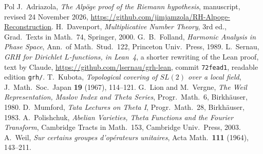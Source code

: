 \documentclass[reqno]{amsart}
\theoremstyle{definition}
\theoremstyle{plain}
\begin{document}
\begin{thebibliography}{Pol}
 J.~Adriazola, \emph{The Alp\"oge proof of the Riemann hypothesis}, manuscript, revised 24 November 2026, \url{https://github.com/jimjamzola/RH-Alpoge-Reconstruction}.
 H.~Davenport, \emph{Multiplicative Number Theory}, 3rd ed., Grad.\ Texts in Math.\ 74, Springer, 2000.
 G.~B.~Folland, \emph{Harmonic Analysis in Phase Space}, Ann.\ of Math.\ Stud.\ 122, Princeton Univ.\ Press, 1989.
 L.~Sernau, \emph{GRH for Dirichlet \(L\)-functions, in Lean~4}, a shorter rewriting of the Lean proof, text by Claude, \url{https://github.com/lsernau/grh-lean}, commit \texttt{72fead1}, readable edition \texttt{grh/}.
 T.~Kubota, \emph{Topological covering of \(SL(2)\) over a local field}, J.\ Math.\ Soc.\ Japan \textbf{19} (1967), 114--121.
 G.~Lion and M.~Vergne, \emph{The Weil Representation, Maslov Index and Theta Series}, Progr.\ Math.\ 6, Birkh\"auser, 1980.
 D.~Mumford, \emph{Tata Lectures on Theta I}, Progr.\ Math.\ 28, Birkh\"auser, 1983.
 A.~Polishchuk, \emph{Abelian Varieties, Theta Functions and the Fourier Transform}, Cambridge Tracts in Math.\ 153, Cambridge Univ.\ Press, 2003.
 A.~Weil, \emph{Sur certains groupes d'op\'erateurs unitaires}, Acta Math.\ \textbf{111} (1964), 143--211.
\end{thebibliography}
\end{document}
